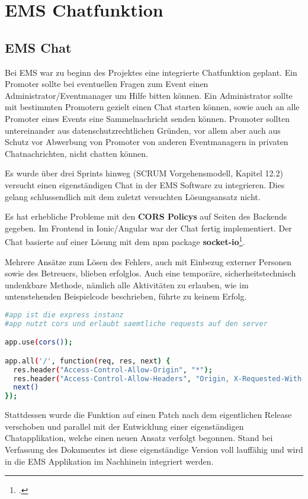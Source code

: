 \chapter{EMS Chatfunktion}
\putz
\section{EMS Chat}
Bei EMS war zu beginn des Projektes eine integrierte Chatfunktion geplant. Ein Promoter sollte bei eventuellen Fragen zum Event einen Administrator/Eventmanager um Hilfe bitten können.
Ein Administrator sollte mit bestimmten Promotern gezielt einen Chat starten können, sowie auch an alle Promoter eines Events eine Sammelnachricht senden können.
Promoter sollten untereinander aus datenschutzrechtlichen Gründen, vor allem aber auch
aus Schutz vor Abwerbung von Promoter von anderen Eventmanagern in privaten Chatnachrichten, nicht chatten können.

Es wurde über drei Sprints hinweg (SCRUM Vorgehensmodell, Kapitel 12.2) versucht einen eigenständigen Chat in der EMS Software zu integrieren. Dies gelang schlussendlich mit dem zuletzt versuchten Lösungsansatz nicht.

Es hat erhebliche Probleme mit den \textbf{CORS Policys} auf Seiten des Backends gegeben.
Im Frontend in Ionic/Angular war der Chat fertig implementiert. Der Chat basierte auf einer Lösung mit dem npm package \textbf{socket-io}\footcite{socket-io}.

Mehrere Ansätze zum Lösen des Fehlers, auch mit Einbezug externer Personen sowie des Betreuers, blieben erfolglos.
Auch eine temporäre, sicherheitstechnisch undenkbare Methode, nämlich alle Aktivitäten zu erlauben, wie im untenstehenden Beispielcode beschrieben, führte zu keinem Erfolg.

\begin{lstlisting}[language=bash]
#app ist die express instanz
#app nutzt cors und erlaubt saemtliche requests auf den server 

app.use(cors());

app.all('/', function(req, res, next) {
  res.header("Access-Control-Allow-Origin", "*");
  res.header("Access-Control-Allow-Headers", "Origin, X-Requested-With, Content-Type, Accept");
  next()
});
\end{lstlisting}

Stattdessen wurde die Funktion auf einen Patch nach dem eigentlichen Release verschoben und parallel mit der Entwicklung einer eigenständigen Chatapplikation, welche einen neuen Ansatz verfolgt begonnen.
Stand bei Verfassung des Dokumentes ist diese eigenständige Version voll lauffähig und wird in die EMS Applikation im Nachhinein integriert werden.

